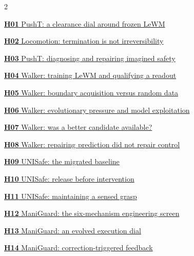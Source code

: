 \documentclass[11pt,a4paper]{article}
\begin{document}
\vspace{4mm}
\begin{multicols}{2}
\small
\raggedright

\noindent\hyperref[exp:H01]{\textbf{H01} PushT: a clearance dial around frozen LeWM}\par\vspace{5pt}
\noindent\hyperref[exp:H02]{\textbf{H02} Locomotion: termination is not irreversibility}\par\vspace{5pt}
\noindent\hyperref[exp:H03]{\textbf{H03} PushT: diagnosing and repairing imagined safety}\par\vspace{5pt}
\noindent\hyperref[exp:H04]{\textbf{H04} Walker: training LeWM and qualifying a readout}\par\vspace{5pt}
\noindent\hyperref[exp:H05]{\textbf{H05} Walker: boundary acquisition versus random data}\par\vspace{5pt}
\noindent\hyperref[exp:H06]{\textbf{H06} Walker: evolutionary pressure and model exploitation}\par\vspace{5pt}
\noindent\hyperref[exp:H07]{\textbf{H07} Walker: was a better candidate available?}\par\vspace{5pt}
\noindent\hyperref[exp:H08]{\textbf{H08} Walker: repairing prediction did not repair control}\par\vspace{5pt}
\noindent\hyperref[exp:H09]{\textbf{H09} UNISafe: the migrated baseline}\par\vspace{5pt}
\noindent\hyperref[exp:H10]{\textbf{H10} UNISafe: release before intervention}\par\vspace{5pt}
\noindent\hyperref[exp:H11]{\textbf{H11} UNISafe: maintaining a sensed grasp}\par\vspace{5pt}
\noindent\hyperref[exp:H12]{\textbf{H12} ManiGuard: the six-mechanism engineering screen}\par\vspace{5pt}
\noindent\hyperref[exp:H13]{\textbf{H13} ManiGuard: an evolved execution dial}\par\vspace{5pt}
\noindent\hyperref[exp:H14]{\textbf{H14} ManiGuard: correction-triggered feedback}\par\vspace{5pt}

\end{multicols}
\end{document}
